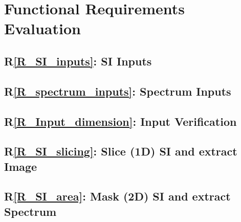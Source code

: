 \documentclass[12pt, titlepage]{article}
\newcommand{\rref}[1]{R\ref{#1}}
\begin{document}
\section{Functional Requirements Evaluation}
\subsection{\rref{R_SI_inputs}: SI Inputs}

\subsection{\rref{R_spectrum_inputs}: Spectrum Inputs}

\subsection{\rref{R_Input_dimension}: Input Verification}

\subsection{\rref{R_SI_slicing}: Slice (1D) SI and extract Image}

\subsection{\rref{R_SI_area}: Mask (2D) SI and extract Spectrum}
\end{document}
